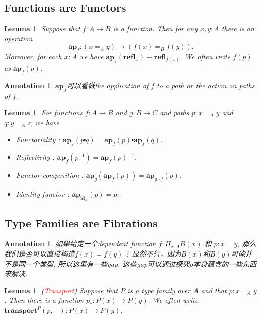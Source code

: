\documentclass{article}
\newtheorem{lemma}[theorem]{Lemma}
\newtheorem{annotation}[theorem]{Annotation}
\newcommand{\redt}[1]{\textcolor{red}{#1}}
\newcommand{\refl}{\textbf{refl}}
\newcommand{\id}{\textbf{id}}
\newcommand{\ap}{\textbf{ap}}
\newcommand{\transport}{\textbf{transport}}
\begin{document}
\subsection{Functions are Functors}

\begin{lemma}
\rm Suppose that $f : A \to B$ is a function. Then for any $x,y : A$ there is an operation
\[
    \ap_f:(x =_A y) \to (f(x) =_B f(y)).
\]
Moreover, for each $x : A$ we have $\ap_f(\refl_x) \equiv \refl_{f(x)}$. We often write $f(p)$ as $\ap_f(p)$.
\end{lemma}

\begin{annotation}
\rm $\ap_f$可以看做the application of $f$ to a path or the action on paths of $f$.
\end{annotation}


\begin{lemma}
\rm For functions $f : A \to B$ and $g : B \to C$ and paths $p : x=_A y$ and $q : y=_A z$, we have
\begin{itemize}
    \item Functoriality : $\ap_f(p \centerdot q) = \ap_f(p)\centerdot \ap_f(q)$.
    \item Reflectivity : $\ap_f(p^{-1}) = \ap_f(p)^{-1}$.
    \item Functor composition : $\ap_g(\ap_f(p)) = \ap_{g \circ f}(p)$.
    \item Identity functor : $\ap_{\id_A}(p) = p$.
\end{itemize}
\end{lemma}

\subsection{Type Families are Fibrations}

\begin{annotation}
\rm 如果给定一个dependent function $f : \Pi_{x : A} B(x)$ 和 $p : x = y$, 那么我们是否可以直接构造$f(x) = f(y)$ ? 显然不行，因为$B(x)$和$B(y)$可能并不是同一个类型. 所以这里有一些gap, 这些gap可以通过探究$p$本身蕴含的一些东西来解决. 
\end{annotation}

\begin{lemma}
\rm (\redt{Transport}) Suppose that $P$ is a type family over $A$ and that $p : x =_A y$. Then there is a function $p_*: P(x) \to P(y)$. We often write $\transport^P(p,-) : P(x) \to P(y)$.
\end{lemma}
\end{document}
